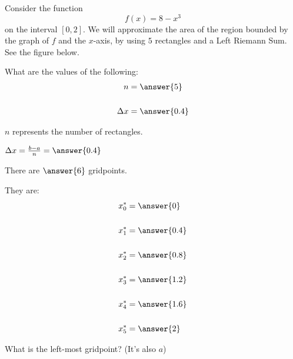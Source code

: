 \documentclass{ximera}
\author{Bobby Ramsey}
\begin{document}
\begin{exercise}

Consider the function
\[
f(x) = 8-x^3
\]
on the interval $[0,2]$.  We will approximate the area of the region bounded by the graph of $f$ and the $x$-axis, by using $5$ rectangles and a Left Riemann Sum.  See the figure below.

\begin{image}
\end{image}

What are the values of the following:
\begin{align*}
	n &= \answer{5} \\ \\
	\Delta x &= \answer{0.4}
\end{align*}
	\begin{hint}
		$n$ represents the number of rectangles.
	\end{hint}
	\begin{hint}
		$\Delta x = \frac{b-a}{n} = \answer{0.4}$
	\end{hint}

	\begin{exercise}
		There are $\answer{6}$ gridpoints.		

		\begin{exercise}
			They are:
			\begin{align*}
				x_0^* &= \answer{0} \\ \\
				x_1^* &= \answer{0.4} \\ \\
				x_2^* &= \answer{0.8} \\ \\
				x_3^* &= \answer{1.2} \\ \\
				x_4^* &= \answer{1.6} \\ \\
				x_5^* &= \answer{2}
			\end{align*}
			\begin{hint}
				What is the left-most gridpoint?  (It's also $a$)
				

\end{hint}
\end{exercise}
\end{exercise}
\end{exercise}
\end{document}
